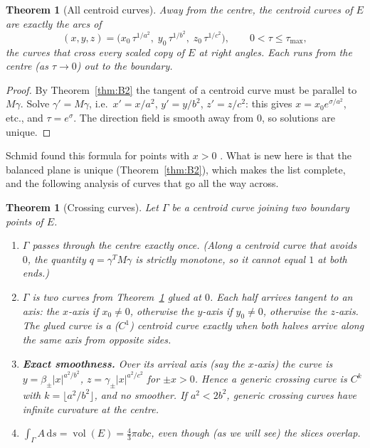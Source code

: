 \documentclass[11pt]{article}
\theoremstyle{plain}
\newtheorem{theorem}[lemma]{Theorem}
\theoremstyle{definition}
\theoremstyle{remark}
\newcommand{\vol}{\operatorname{vol}}
\newcommand{\dd}{\,\mathrm{d}}
\begin{document}
\begin{theorem}[All centroid curves]\label{thm:B3}
Away from the centre, the centroid curves of $E$ are exactly the arcs of
\[
  (x,y,z)=\bigl(x_0\,\tau^{1/a^2},\;y_0\,\tau^{1/b^2},\;z_0\,\tau^{1/c^2}\bigr),\qquad 0<\tau\le\tau_{\max},
\]
the curves that cross every scaled copy of $E$ at right angles. Each runs from the centre (as $\tau\to0$) out to the boundary.
\end{theorem}
\begin{proof}
By Theorem~\ref{thm:B2} the tangent of a centroid curve must be parallel to $M\gamma$. Solve $\gamma'=M\gamma$, i.e.\ $x'=x/a^2$, $y'=y/b^2$, $z'=z/c^2$: this gives $x=x_0e^{\sigma/a^2}$, etc., and $\tau=e^{\sigma}$. The direction field is smooth away from $0$, so solutions are unique.
\end{proof}

Schmid found this formula for points with $x>0$ \cite[Prop.~7]{schmid}. What is new here is that the balanced plane is unique (Theorem~\ref{thm:B2}), which makes the list complete, and the following analysis of curves that go all the way across.

\begin{theorem}[Crossing curves]\label{thm:B4}
Let $\Gamma$ be a centroid curve joining two boundary points of $E$.
\begin{enumerate}[label=(\arabic*)]
\item $\Gamma$ passes through the centre exactly once. (Along a centroid curve that avoids $0$, the quantity $q=\gamma^TM\gamma$ is strictly monotone, so it cannot equal $1$ at both ends.)
\item $\Gamma$ is two curves from Theorem~\ref{thm:B3} glued at $0$. Each half arrives tangent to an axis: the $x$-axis if $x_0\ne0$, otherwise the $y$-axis if $y_0\ne0$, otherwise the $z$-axis. The glued curve is a ($C^1$) centroid curve exactly when both halves arrive along the same axis from opposite sides.
\item \textbf{Exact smoothness.} Over its arrival axis (say the $x$-axis) the curve is $y=\beta_\pm|x|^{a^2/b^2}$, $z=\gamma_\pm|x|^{a^2/c^2}$ for $\pm x>0$. Hence a generic crossing curve is $C^{k}$ with $k=\lfloor a^2/b^2\rfloor$, and no smoother. If $a^2<2b^2$, generic crossing curves have \emph{infinite curvature} at the centre.
\item $\displaystyle\int_\Gamma A\dd s=\vol(E)=\tfrac43\pi abc$, even though (as we will see) the slices overlap.
\end{enumerate}
\end{theorem}
\end{document}
